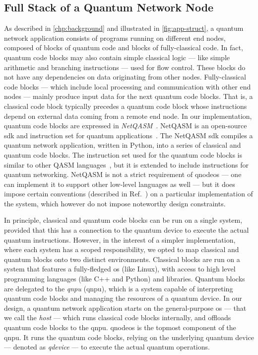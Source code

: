 \subsection{Full Stack of a Quantum Network Node}

As described in \cref{chp:background} and illustrated in \cref{fig:app-struct}, a quantum network
application consists of programs running on different end nodes, composed of blocks of quantum code
and blocks of fully-classical code. In fact, quantum code blocks may also contain simple classical
logic --- like simple arithmetic and branching instructions --- used for flow control. These blocks
do not have any dependencies on data originating from other nodes. Fully-classical code blocks ---
which include local processing and communication with other end nodes --- mainly produce input data
for the next quantum code blocks. That is, a classical code block typically precedes a quantum code
block whose instructions depend on external data coming from a remote end node. In our
implementation, quantum code blocks are expressed in \emph{NetQASM}~\cite{dahlberg_2022_netqasm}.
NetQASM is an open-source \acrfull{sdk} and instruction set for quantum
applications~\cite{netqasm_sdk}. The NetQASM \acrshort{sdk} compiles a quantum network application,
written in Python, into a series of classical and quantum code blocks. The instruction set used for
the quantum code blocks is similar to other QASM languages~\cite{cross_2017_qasm,
khammassi_2018_cqasm, fu_2019_eqasm}, but it is extended to include instructions for quantum
networking. NetQASM is not a strict requirement of \acrshort{qnodeos} --- one can implement it to
support other low-level languages as well --- but it does impose certain conventions (described in
Ref.~\cite{dahlberg_2022_netqasm}) on a particular implementation of the system, which however do
not impose noteworthy design constraints.

In principle, classical and quantum code blocks can be run on a single system, provided that this
has a connection to the quantum device to execute the actual quantum instructions. However, in the
interest of a simpler implementation, where each system has a scoped responsibility, we opted to map
classical and quantum blocks onto two distinct environments. Classical blocks are run on a system
that features a fully-fledged \acrshort{os} (like Linux), with access to high level programming
languages (like C++ and Python) and libraries. Quantum blocks are delegated to the
\emph{\acrlong{qnpu}} (\acrshort{qnpu}), which is a system capable of interpreting quantum code
blocks and managing the resources of a quantum device. In our design, a quantum network application
starts on the general-purpose \acrshort{os} --- that we call the \emph{host} --- which runs
classical code blocks internally, and offloads quantum code blocks to the \acrshort{qnpu}.
\acrshort{qnodeos} is the topmost component of the \acrshort{qnpu}. It runs the quantum code blocks,
relying on the underlying quantum device --- denoted as \emph{\acrshort{qdevice}} --- to execute the
actual quantum operations.

